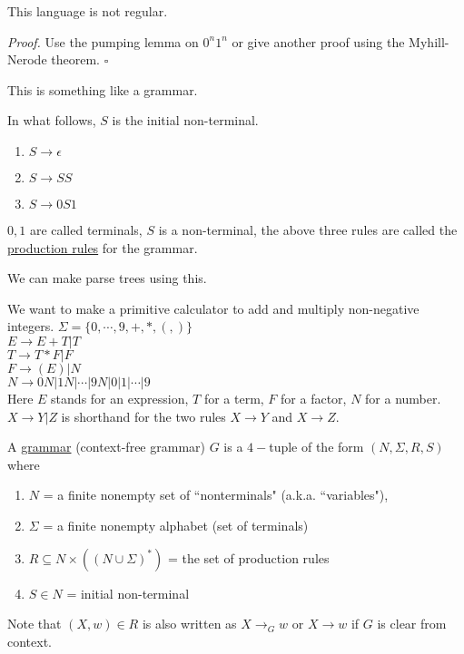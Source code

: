 \documentclass[a4paper]{article}
\newenvironment{proof}{\begin{breakbox}\textit{Proof.}}{\hfill$\square$\end{breakbox}}
\newcommand{\nl}{\vspace{0.2cm}\\}
\begin{document}
\begin{claim}
    This language is not regular.
\end{claim}

\begin{proof}
    Use the pumping lemma on $0^n 1^n$ or give another proof using the Myhill-Nerode theorem.
\end{proof}

This is something like a grammar.

In what follows, $S$ is the initial non-terminal.

\begin{enumerate}
    \item $S \to \epsilon$
    \item $S \to SS$
    \item $S \to 0S1$
\end{enumerate}

$0, 1$ are called terminals, $S$ is a non-terminal, the above three rules are called the \underline{production rules} for the grammar.

We can make parse trees using this.

\begin{eg}
    We want to make a primitive calculator to add and multiply non-negative integers.
    $\Sigma = \{0, \cdots, 9, +, *, (, )\}$\nl
    $E \to E + T | T$\nl
    $T \to T * F | F$\nl
    $F \to (E) | N$\nl
    $N \to 0N | 1N | \cdots | 9N | 0 | 1 | \cdots | 9$\nl
    Here $E$ stands for an expression, $T$ for a term, $F$ for a factor, $N$ for a number.\nl
    $X \to Y | Z$ is shorthand for the two rules $X \to Y$ and $X \to Z$.
\end{eg}

\begin{defn}
    A \underline{grammar} (context-free grammar) $G$ is a $4-$tuple of the form $(N, \Sigma, R, S)$ where
\begin{enumerate}
    \item $N$ = a finite nonempty set of ``nonterminals" (a.k.a. ``variables"), 
    \item $\Sigma$ = a finite nonempty alphabet (set of terminals)
    \item $R \subseteq N \times ((N \cup \Sigma)^*)$ = the set of production rules
    \item $S \in N$ = initial non-terminal
\end{enumerate}
Note that $(X, w) \in R$ is also written as $X \to_G w$ or $X \to w$ if $G$ is clear from context.
\end{defn}
\end{document}
